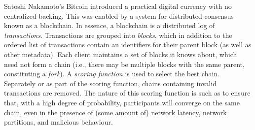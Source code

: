 Satoshi Nakamoto's Bitcoin introduced a practical digital currency with no
centralized backing.\cite{Nakamoto2008} This was enabled by a system for
distributed consensus known as a blockchain. In essence, a blockchain is a
distributed log of \textit{transactions}. Transactions are grouped into
\textit{blocks}, which in addition to the ordered list of transactions
contain an identifiers for their parent block (as well as other metadata). Each
client maintains a set of blocks it knows about, which need not form a chain
(i.e., there may be multiple blocks with the same parent, constituting a
\textit{fork}). A \textit{scoring function} is used to select the best chain.
Separately or as part of the scoring function, chains containing invalid
transactions are removed. The nature of this scoring function is such as to
ensure that, with a high degree of probability, participants will converge on
the same chain, even in the presence of (some amount of) network latency,
network partitions, and malicious behaviour.


